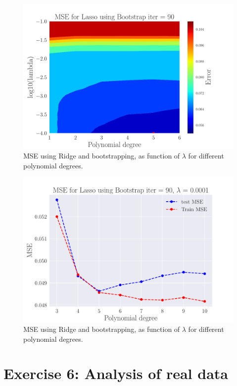 \documentclass[reprint,english,notitlepage,aps,nobalancelastpage,nofootinbib]{revtex4-1}  %
\begin{document}
\begin{figure}[H]
\includegraphics[width=\linewidth]{Contour_PL_Lasso_Bootstrap90_n30_eps0.2_p1_6_lmbm1_m4.pdf}
\caption{MSE using Ridge and bootstrapping, as function of $\lambda$ for different polynomial degrees.}
\label{fig:Ridge_boot_BVT}
\end{figure}


\begin{figure}[H]
	\includegraphics[width=\linewidth]{MSE_Lasso_n30_eps02_pol10_Bootstrap_re90_lam_0_0001.pdf}
	\caption{MSE using Ridge and bootstrapping, as function of $\lambda$ for different polynomial degrees.}
	\label{fig:Ridge_boot_BVT}
\end{figure}



\section*{Exercise 6: Analysis of real data}
\end{document}
